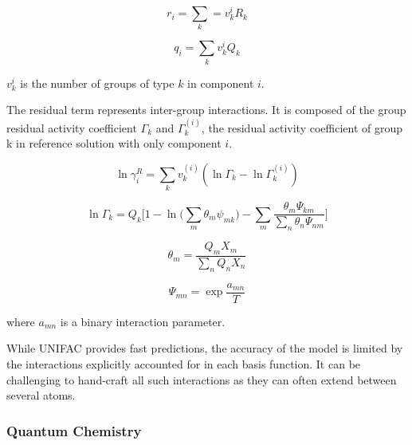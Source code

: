 \begin{equation}
    r_i  = \sum_k = v_k^i R_k
\end{equation}

\begin{equation}
    q_i = \sum_k v_k^i Q_k
\end{equation}

$v_k^i$ is the number of groups of type $k$ in component $i$.

The residual term represents inter-group interactions. It is composed of the group residual activity coefficient $\Gamma_k$ and  $\Gamma_k^{(i)}$, the residual activity coefficient of group k in reference solution with only component $i$.

\begin{equation}
    \ln \gamma^R_i = \sum_k v_k^{(i)}(\ln \Gamma_k - \ln \Gamma_k^{(i)})
\end{equation}

\begin{equation}
    \ln \Gamma_k = Q_k \biggl[1 - \ln \bigl(\sum_m \theta_m \psi_{mk}\bigr) - \sum_m \frac{\theta_m \Psi_{km}}{\sum_n \theta_n \Psi_{nm}} \biggr]
\end{equation}

\begin{equation}
    \theta_m = \frac{Q_m X_m}{\sum_n Q_n X_n}
\end{equation}

\begin{equation}
    \Psi_{mn} = \exp{\frac{a_{mn}}{T}}
\end{equation}

where $a_{mn}$ is a binary interaction parameter. 

While UNIFAC provides fast predictions, the accuracy of the model is limited by the interactions explicitly accounted for in each basis function. It can be challenging to hand-craft all such interactions as they can often extend between several atoms.

\subsubsection{Quantum Chemistry}

